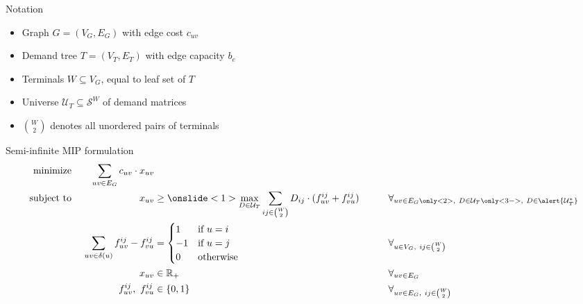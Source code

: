 \documentclass[aspectratio=149]{beamer}
\begin{document}
    \begin{frame}{Notation}
        \begin{itemize}
            \item Graph $G = (V_G, E_G)$ with edge cost $c_{uv}$
            \item Demand tree $T = (V_T, E_T)$ with edge capacity $b_e$
            \item Terminals $W \subseteq V_G$, equal to leaf set of $T$
            \item Universe $\mathcal U_T \subseteq \mathcal S^W$ of demand matrices
            \item $\binom{W}{2}$ denotes all unordered pairs of terminals
        \end{itemize}
    \end{frame}

    \begin{frame}{Semi-infinite MIP formulation}
        \setlength{\TPHorizModule}{\textwidth}%
        \setlength{\TPVertModule}{\textwidth}%
        \vspace*{-3em}
        \begin{alignat*}{5}
            \text{minimize}\ && \sum_{uv \in E_G} c_{uv} \cdot x_{uv} &&& \\
            \text{subject to}\ && x_{uv} &\ge \onslide<1>{\max_{D \in \mathcal U_T}} \sum_{ij \in \binom{W}{2}} D_{ij} \cdot (f_{uv}^{ij} + f_{vu}^{ij}) &&\qquad \forall_{uv \in E_G\only<2>{,\ D \in \mathcal U_T}\only<3->{,\ D \in \alert{\mathcal U^*_T}}} \\
            && \sum_{uv \in \delta(u)} f_{uv}^{ij} - f_{vu}^{ij} &= \begin{cases}
                                         1 & \text{if $u = i$} \\
                                         -1 & \text{if $u = j$} \\
                                         0 & \text{otherwise}
            \end{cases} &&\qquad \forall_{u \in V_G,\ ij \in \binom{W}{2}} \\
            && x_{uv} &\in \mathbb{R}_+ &&\qquad \forall_{uv \in E_G} \\
            && f_{uv}^{ij},\ f_{vu}^{ij} &\in \{ 0, 1 \} &&\qquad \forall_{uv \in E_G,\ ij \in \binom{W}{2}}
        \end{alignat*}%
\end{frame}
\end{document}
